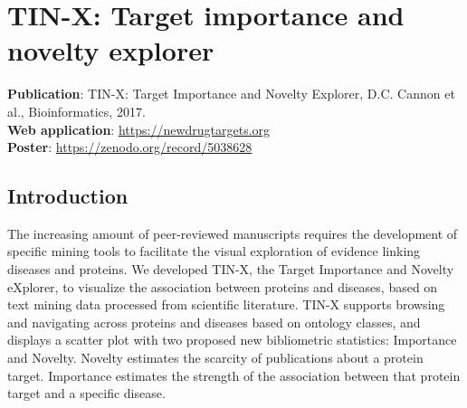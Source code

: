 \newpage

\section{TIN-X: Target importance and novelty explorer}
\label{section:tinx}

\textbf{Publication}: TIN-X: Target Importance and Novelty Explorer, D.C. Cannon et al., Bioinformatics, 2017\cite{Cannon2017-af}.\\
\textbf{Web application}: \href{https://newdrugtargets.org}{https://newdrugtargets.org}\\
\textbf{Poster}: \href{https://zenodo.org/record/5038628}{https://zenodo.org/record/5038628}

\subsection{Introduction}

The increasing amount of peer-reviewed manuscripts requires the development of specific mining tools to facilitate the visual exploration of evidence linking diseases and proteins. We developed TIN-X, the Target Importance and Novelty eXplorer, to visualize the association between proteins and diseases, based on text mining data processed from scientific literature. TIN-X supports browsing and navigating across proteins and diseases based on ontology classes, and displays a scatter plot with two proposed new bibliometric statistics: Importance and Novelty. Novelty estimates the scarcity of publications about a protein target. Importance estimates the strength of the association between that protein target and a specific disease.

